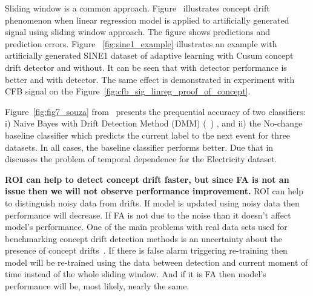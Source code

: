 \documentclass[12 pt]{article}
\begin{document}
  Sliding window is a common approach.
  Figure~\cite{fig:art_sig_example} illustrates concept drift phenomenon when linear regression model is applied to artificially generated signal using sliding window approach. 
  The figure shows predictions and prediction errors.
  Figure ~\ref{fig:sine1_example} illustrates an example with artificially generated SINE1 dataset of adaptive learning with Cusum concept drift detector and without. 
  It can be seen that with detector performance is better and with detector.
  The same effect is demonstrated in experiment with CFB signal on the Figure~\ref{fig:cfb_sig_linreg_proof_of_concept}.

  Figure~\ref{fig:fig7_souza} from~\cite{SouzaRMB20} presents the prequential accuracy of two classifiers: i) Naive Bayes with Drift Detection Method (DMM) (~\cite{gama2004learning}) , and ii) the No-change baseline classifier which predicts the current label to the next event for three datasets. In all cases, the baseline classifier performs better.
  Due that in~\cite{zliobaite2013good} discusses the problem of temporal dependence for the Electricity dataset.

  \textbf{ROI can help to detect concept drift faster, but since FA is not an issue then we will not observe performance improvement.}
  ROI can help to distinguish noisy data from drifts. If model is updated using noisy data then performance will decrease.
  If FA is not due to the noise than it doesn't affect model's performance. 
  One of the main problems with real data sets used for benchmarking concept drift detection methods is an uncertainty about the presence of concept drifts~\cite{SouzaRMB20}.
  If there is false alarm triggering re-training then model will be re-trained using the data between detection and current moment of time instead of the whole sliding window.
  And if it is FA then model's performance will be, most likely, nearly the same.
\end{document}
